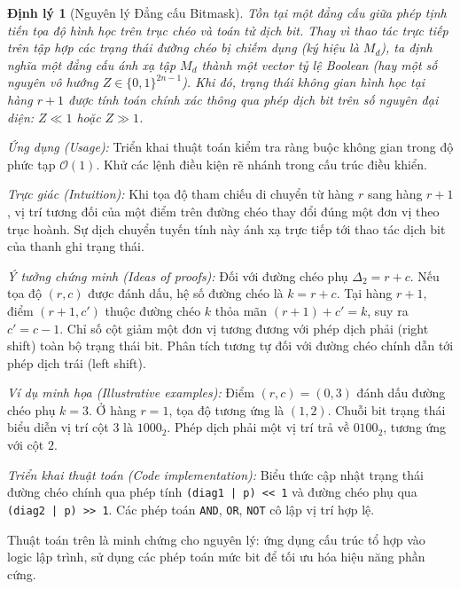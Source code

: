 \documentclass{article}
\newtheorem{dinhly}{Định lý}
\begin{document}
\begin{dinhly}[Nguyên lý Đẳng cấu Bitmask]
Tồn tại một đẳng cấu giữa phép tịnh tiến tọa độ hình học trên trục chéo và toán tử dịch bit. Thay vì thao tác trực tiếp trên tập hợp các trạng thái đường chéo bị chiếm dụng (ký hiệu là $M_d$), ta định nghĩa một đẳng cấu ánh xạ tập $M_d$ thành một vector tỷ lệ Boolean (hay một số nguyên vô hướng $Z \in \{0, 1\}^{2n-1}$). Khi đó, trạng thái không gian hình học tại hàng $r+1$ được tính toán chính xác thông qua phép dịch bit trên số nguyên đại diện: $Z \ll 1$ hoặc $Z \gg 1$.
\end{dinhly}

\emph{Ứng dụng (Usage):}
Triển khai thuật toán kiểm tra ràng buộc không gian trong độ phức tạp $\mathcal{O}(1)$. Khử các lệnh điều kiện rẽ nhánh trong cấu trúc điều khiển.

\emph{Trực giác (Intuition):}
Khi tọa độ tham chiếu di chuyển từ hàng $r$ sang hàng $r+1$, vị trí tương đối của một điểm trên đường chéo thay đổi đúng một đơn vị theo trục hoành. Sự dịch chuyển tuyến tính này ánh xạ trực tiếp tới thao tác dịch bit của thanh ghi trạng thái.

\emph{Ý tưởng chứng minh (Ideas of proofs):}
Đối với đường chéo phụ $\Delta_2 = r + c$. Nếu tọa độ $(r, c)$ được đánh dấu, hệ số đường chéo là $k = r + c$. Tại hàng $r+1$, điểm $(r+1, c')$ thuộc đường chéo $k$ thỏa mãn $(r+1) + c' = k$, suy ra $c' = c - 1$. Chỉ số cột giảm một đơn vị tương đương với phép dịch phải (right shift) toàn bộ trạng thái bit. Phân tích tương tự đối với đường chéo chính dẫn tới phép dịch trái (left shift).

\emph{Ví dụ minh họa (Illustrative examples):}
Điểm $(r, c) = (0, 3)$ đánh dấu đường chéo phụ $k=3$. Ở hàng $r=1$, tọa độ tương ứng là $(1, 2)$. Chuỗi bit trạng thái biểu diễn vị trí cột $3$ là $1000_2$. Phép dịch phải một vị trí trả về $0100_2$, tương ứng với cột $2$.

\emph{Triển khai thuật toán (Code implementation):}
Biểu thức cập nhật trạng thái đường chéo chính qua phép tính \texttt{(diag1 | p) << 1} và đường chéo phụ qua \texttt{(diag2 | p) >> 1}. Các phép toán \texttt{AND}, \texttt{OR}, \texttt{NOT} cô lập vị trí hợp lệ.

Thuật toán trên là minh chứng cho nguyên lý: ứng dụng cấu trúc tổ hợp vào logic lập trình, sử dụng các phép toán mức bit để tối ưu hóa hiệu năng phần cứng.
\end{document}
